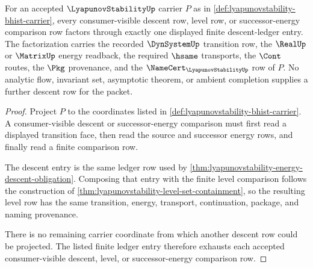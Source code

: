 \begin{theorem}
\label{thm:lyapunovstability-finite-descent-ledger-exactness}
For an accepted $\LyapunovStabilityUp$ carrier $P$ as in \autoref{def:lyapunovstability-bhist-carrier}, every consumer-visible descent row, level row, or successor-energy comparison row factors through exactly one displayed finite descent-ledger entry. The factorization carries the recorded $\DynSystemUp$ transition row, the $\RealUp$ or $\MatrixUp$ energy readback, the required $\hsame$ transports, the $\Cont$ routes, the $\Pkg$ provenance, and the $\NameCert_{\LyapunovStabilityUp}$ row of $P$. No analytic flow, invariant set, asymptotic theorem, or ambient completion supplies a further descent row for the packet.
\end{theorem}
\begin{proof}
Project $P$ to the coordinates listed in \autoref{def:lyapunovstability-bhist-carrier}. A consumer-visible descent or successor-energy comparison must first read a displayed transition face, then read the source and successor energy rows, and finally read a finite comparison row.

The descent entry is the same ledger row used by \autoref{thm:lyapunovstability-energy-descent-obligation}. Composing that entry with the finite level comparison follows the construction of \autoref{thm:lyapunovstability-level-set-containment}, so the resulting level row has the same transition, energy, transport, continuation, package, and naming provenance.

There is no remaining carrier coordinate from which another descent row could be projected. The listed finite ledger entry therefore exhausts each accepted consumer-visible descent, level, or successor-energy comparison row.
\end{proof}

